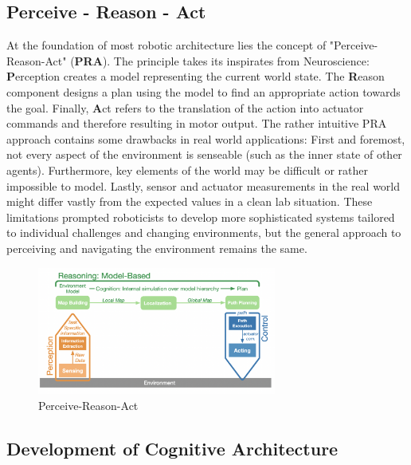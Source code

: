 \documentclass[%
paper=A4,               %
twoside=true,           %
openright,              %
11pt,                   %
bibliography=totoc,     %
titlepage=on,           %
DIV=12,                 %
BCOR=1.5cm,             %
parskip=half,            %
final
]{scrreprt}
\begin{document}
	\subsection{Perceive - Reason - Act}
	At the foundation of most robotic architecture lies the concept of "Perceive-Reason-Act" (\textbf{PRA}).
	The principle takes its inspirates from Neuroscience: \textbf{P}erception creates a model representing the current world state. The \textbf{R}eason component designs a plan using the model to find an appropriate action towards the goal. Finally, \textbf{A}ct refers to the translation of the action into actuator commands and therefore resulting in motor output. \autocite{schillingAutonomeSystemeUnd2023} The rather intuitive PRA approach contains some drawbacks in real world applications: First and foremost, not every aspect of the environment is senseable (such as the inner state of other agents). Furthermore, key elements of the world may be difficult or rather impossible to model. Lastly, sensor and actuator measurements in the real world might differ vastly from the expected values in a clean lab situation. \autocite{schillingAutonomeSystemeUnd2023} These limitations prompted roboticists to develop more sophisticated systems tailored to individual challenges and changing environments, but the general approach to perceiving and navigating the environment remains the same.
	
	\begin{figure}[ht] 
		\centering
		\includegraphics[width=0.7\textwidth]{Graphics/PRA}
		\caption{Perceive-Reason-Act \autocite{schillingAutonomeSystemeUnd2023}}
		\label{fig: fig1}
	\end{figure}
	
	
	\subsection{Development of Cognitive Architecture} 
	
\end{document}
